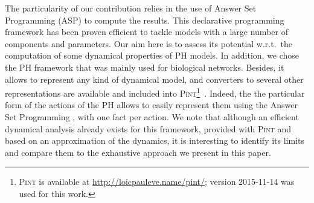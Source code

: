  The particularity of our contribution relies in the use of Answer Set Programming
(ASP) \cite{baral2003knowledge}
to compute the results.
This declarative programming framework has been proven efficient
to tackle models with a large number of components and parameters.
Our aim here is to assess its potential w.r.t.\ the computation
of some dynamical properties of PH models. In addition, we chose the PH framework that was mainly used for biological networks. Besides, it allows to represent any kind of dynamical model,
and converters to several other representations are available and included into \textsc{Pint}\footnote{\textsc{Pint} is available at \url{http://loicpauleve.name/pint/}; version 2015-11-14 was used for this work.}~\cite{PMR12-MSCS}.
Indeed, the the particular form of the actions of the PH allows
to easily represent them using the Answer Set Programming \cite{Baral03, Vladimir, Glimpse, sureshkumar2006ansprolog},
with one fact per action.
We note that although an efficient dynamical analysis already exists for this framework,
provided with \textsc{Pint} and based on an approximation of the dynamics,
it is interesting to identify its limits
and compare them to the exhaustive approach we present in this paper.
